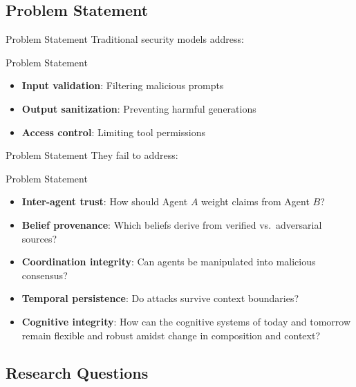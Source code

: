 \documentclass[
  ignorenonframetext,
]{beamer}
\begin{document}
\subsection{Problem Statement}\label{sec:problem}

\begin{frame}[allowframebreaks]{Problem Statement}
Traditional security models address:

\end{frame}

\begin{frame}[allowframebreaks]{Problem Statement}
\begin{itemize}
\item \textbf{Input validation}: Filtering malicious prompts
\item \textbf{Output sanitization}: Preventing harmful generations
\item \textbf{Access control}: Limiting tool permissions
\end{itemize}

\end{frame}

\begin{frame}[allowframebreaks]{Problem Statement}
They fail to address:

\end{frame}

\begin{frame}[allowframebreaks]{Problem Statement}
\begin{itemize}
\item \textbf{Inter-agent trust}: How should Agent $A$ weight claims from Agent $B$?
\item \textbf{Belief provenance}: Which beliefs derive from verified vs.\ adversarial sources?
\item \textbf{Coordination integrity}: Can agents be manipulated into malicious consensus?
\item \textbf{Temporal persistence}: Do attacks survive context boundaries?
\item \textbf{Cognitive integrity}: How can the cognitive systems of today and tomorrow remain flexible and robust amidst change in composition and context?
\end{itemize}
\end{frame}

\subsection{Research Questions}\label{sec:research-questions}
\end{document}
